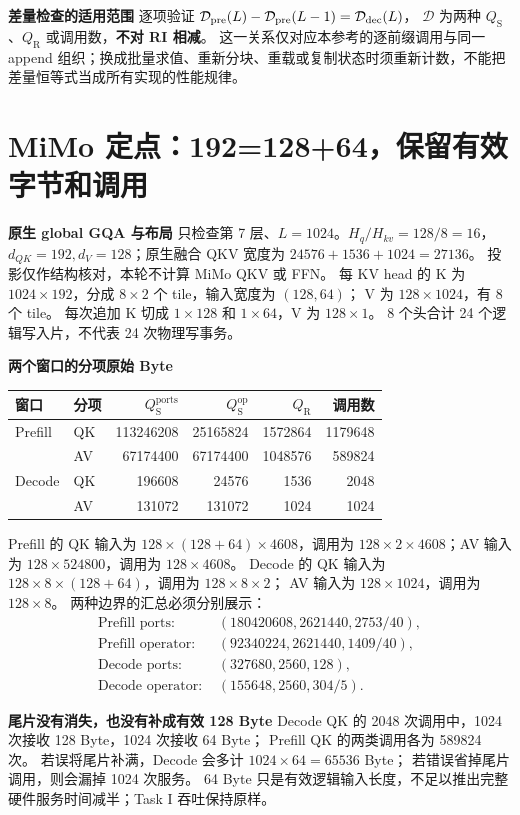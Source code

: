 \documentclass[11pt,a4paper,fontset=fandol]{ctexart}
\newcommand{\qs}{Q_{\mathrm S}}
\newcommand{\qr}{Q_{\mathrm R}}
\newcommand{\op}{\mathrm{op}}
\newcommand{\loc}{\mathrm{ports}}
\newcommand{\para}[1]{\par\smallskip\noindent\textbf{#1}\quad}
\begin{document}
\para{差量检查的适用范围}
逐项验证 $\mathcal D_{\rm pre}(L)-\mathcal D_{\rm pre}(L-1)=\mathcal D_{\rm dec}(L)$，
$\mathcal D$ 为两种 $\qs$、$\qr$ 或调用数，\textbf{不对 RI 相减}。
这一关系仅对应本参考的逐前缀调用与同一 append 组织；换成批量求值、重新分块、重载或复制状态时须重新计数，不能把差量恒等式当成所有实现的性能规律。

\clearpage
\section{MiMo 定点：192=128+64，保留有效字节和调用}
\para{原生 global GQA 与布局}
只检查第 7 层、$L=1024$。$H_q/H_{kv}=128/8=16$，
$d_{QK}=192,d_V=128$；原生融合 QKV 宽度为 $24576+1536+1024=27136$。
投影仅作结构核对，本轮不计算 MiMo QKV 或 FFN。
每 KV head 的 K 为 $1024\times192$，分成 $8\times2$ 个 tile，输入宽度为 $(128,64)$；
V 为 $128\times1024$，有 8 个 tile。
每次追加 K 切成 $1\times128$ 和 $1\times64$，V 为 $128\times1$。
8 个头合计 24 个逻辑写入片，不代表 24 次物理写事务。

\para{两个窗口的分项原始 Byte}
\begin{center}\small
\begin{tabular}{@{}llrrrr@{}}\toprule
窗口 & 分项 & $\qs^{\loc}$ & $\qs^{\op}$ & $\qr$ & 调用数\\\midrule
Prefill & QK & 113246208 & 25165824 & 1572864 & 1179648\\
 & AV & 67174400 & 67174400 & 1048576 & 589824\\\midrule
Decode & QK & 196608 & 24576 & 1536 & 2048\\
 & AV & 131072 & 131072 & 1024 & 1024\\\bottomrule
\end{tabular}\end{center}
Prefill 的 QK 输入为 $128\times(128+64)\times4608$，调用为
$128\times2\times4608$；AV 输入为 $128\times524800$，调用为 $128\times4608$。
Decode 的 QK 输入为 $128\times8\times(128+64)$，调用为 $128\times8\times2$；
AV 输入为 $128\times1024$，调用为 $128\times8$。
两种边界的汇总必须分别展示：
\begin{align*}
\text{Prefill ports: } &(180420608,2621440,2753/40),\\
\text{Prefill operator: } &(92340224,2621440,1409/40),\\
\text{Decode ports: } &(327680,2560,128),\\
\text{Decode operator: } &(155648,2560,304/5).
\end{align*}

\para{尾片没有消失，也没有补成有效 128 Byte}
Decode QK 的 2048 次调用中，1024 次接收 128 Byte，1024 次接收 64 Byte；
Prefill QK 的两类调用各为 589824 次。
若误将尾片补满，Decode 会多计 $1024\times64=65536$ Byte；
若错误省掉尾片调用，则会漏掉 1024 次服务。
64 Byte 只是有效逻辑输入长度，不足以推出完整硬件服务时间减半；Task I 吞吐保持原样。
\end{document}
